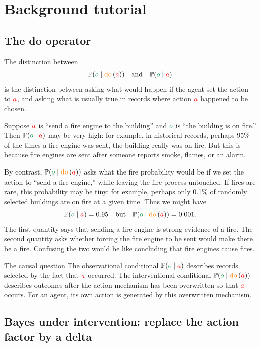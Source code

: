 \documentclass[11pt]{article}
\newcommand{\action}{\ensuremath{\textcolor{red}{a}}}
\newcommand{\obs}{\ensuremath{\textcolor{ForestGreen}{o}}}
\newcommand{\prob}{\ensuremath{\mathbb{P}}}
\newcommand{\doop}{\operatorname{\textcolor{orange}{do}}}
\newcommand{\intervene}[1]{\ensuremath{\doop \left(#1\right)}}
\begin{document}
\section{Background tutorial}



\subsection{The do operator}
\label{sec:actions-interventions}



The distinction between
\[
  \prob(\obs\mid \intervene{\action})
  \quad\text{and}\quad
  \prob(\obs\mid \action)
\]
is the distinction between asking what would happen if the agent set the action
to $\action$, and asking what is usually true in records where action $\action$
happened to be chosen.

Suppose $\action$ is ``send a fire engine to the building'' and $\obs$ is
``the building is on fire.'' Then $\prob(\obs\mid \action)$ may be very high:
for example, in historical records, perhaps 95\% of the times a fire engine was
sent, the building really was on fire. But this is because fire engines are sent
after someone reports smoke, flames, or an alarm.

By contrast, $\prob(\obs\mid \intervene{\action})$ asks what the fire
probability would be if we set the action to ``send a fire engine,'' while
leaving the fire process untouched. If fires are rare, this probability may be
tiny: for example, perhaps only 0.1\% of randomly selected buildings are on fire
at a given time. Thus we might have
\[
  \prob(\obs\mid \action) = 0.95
  \quad\text{but}\quad
  \prob(\obs\mid \intervene{\action}) = 0.001.
\]
The first quantity says that sending a fire engine is strong evidence of a fire.
The second quantity asks whether forcing the fire engine to be sent would make
there be a fire. Confusing the two would be like concluding that fire engines
cause fires.

\begin{keybox}{The causal question}
The observational conditional $\prob(\obs\mid \action)$ describes records selected by the
fact that $\action$ occurred. The interventional conditional $\prob(\obs\mid \intervene{\action})$
describes outcomes after the action mechanism has been overwritten so that $\action$
occurs. For an agent, its own action is generated by this overwritten mechanism.
\end{keybox}


\subsection{Bayes under intervention: replace the action factor by a delta}
\end{document}
